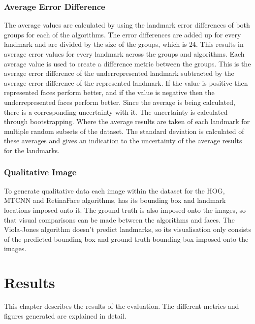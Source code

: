 \documentclass{l4proj}
\begin{document}
\subsection{Average Error Difference}
The average values are calculated by using the landmark error differences of both groups for each of the algorithms. The error differences are added up for every landmark and are divided by the size of the groups, which is 24. This results in average error values for every landmark across the groups and algorithms. Each average value is used to create a difference metric between the groups. This is the average error difference of the underrepresented landmark subtracted by the average error difference of the represented landmark. If the value is positive then represented faces perform better, and if the value is negative then the underrepresented faces perform better. Since the average is being calculated, there is a corresponding uncertainty with it. The uncertainty is calculated through bootstrapping. Where the average results are taken of each landmark for multiple random subsets of the dataset. The standard deviation is calculated of these averages and gives an indication to the uncertainty of the average results for the landmarks.
\subsection{Qualitative Image}
To generate qualitative data each image within the dataset for the HOG, MTCNN and RetinaFace algorithms, has its bounding box and landmark locations imposed onto it. The ground truth is also imposed onto the images, so that visual comparisons can be made between the algorithms and faces. The Viola-Jones algorithm doesn't predict landmarks, so its visualisation only consists of the predicted bounding box and ground truth bounding box imposed onto the images.

\chapter{Results}
\label{results}
This chapter describes the results of the evaluation. The different metrics and figures generated are explained in detail.
\end{document}
